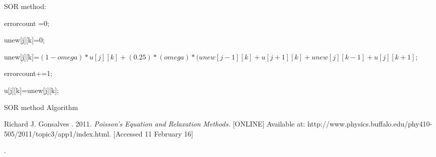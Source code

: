 \documentclass{article}
\begin{document}
\begin{algorithm}
\begin{algorithmic}
\EndFor


\EndFor


\State SOR method:




\State errorcount =0;








\State unew[j][k]=0;


\Else


\State unew[j][k]=$(1-omega)*u[j][k]+(0.25)*(omega)*(unew[j-1][k]+u[j+1][k] + unew[j][k-1] + u[j][k+1]$;


\EndIf


\EndFor


\EndFor






\State errorcount+=1;


\EndIf


\EndFor






\State u[j][k]=unew[j][k];


\EndFor


\EndFor


\EndWhile


\caption{SOR method Algorithm}


\EndProcedure


\end{algorithmic}


\end{algorithm}












\begin{thebibliography}{9}









Richard J. Gonsalves . 2011. \textit{Poisson's Equation and Relaxation Methods.} [ONLINE] Available at: http://www.physics.buffalo.edu/phy410-505/2011/topic3/app1/index.html. [Accessed 11 February 16]


    


\end{thebibliography}


.
\end{document}
